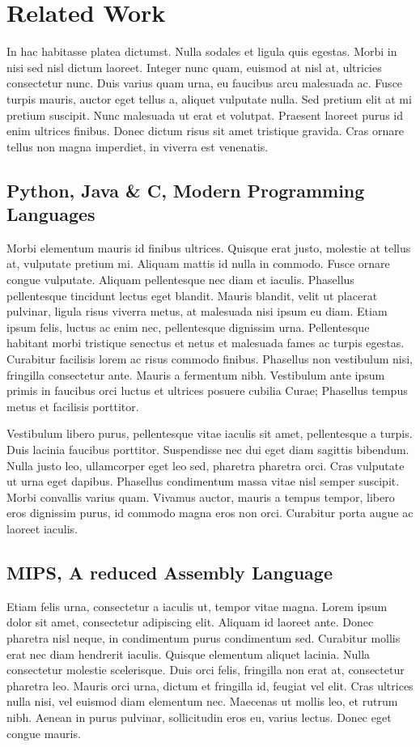 \chapter{Related Work}
In hac habitasse platea dictumst. Nulla sodales et ligula quis egestas. Morbi in nisi sed nisl dictum laoreet. Integer nunc quam, euismod at nisl at, ultricies consectetur nunc. Duis varius quam urna, eu faucibus arcu malesuada ac. Fusce turpis mauris, auctor eget tellus a, aliquet vulputate nulla. Sed pretium elit at mi pretium suscipit. Nunc malesuada ut erat et volutpat. Praesent laoreet purus id enim ultrices finibus. Donec dictum risus sit amet tristique gravida. Cras ornare tellus non magna imperdiet, in viverra est venenatis.


\section{Python, Java \& C, Modern Programming Languages}
Morbi elementum mauris id finibus ultrices. Quisque erat justo, molestie at tellus at, vulputate pretium mi. Aliquam mattis id nulla in commodo. Fusce ornare congue vulputate. Aliquam pellentesque nec diam et iaculis. Phasellus pellentesque tincidunt lectus eget blandit. Mauris blandit, velit ut placerat pulvinar, ligula risus viverra metus, at malesuada nisi ipsum eu diam. Etiam ipsum felis, luctus ac enim nec, pellentesque dignissim urna. Pellentesque habitant morbi tristique senectus et netus et malesuada fames ac turpis egestas. Curabitur facilisis lorem ac risus commodo finibus. Phasellus non vestibulum nisi, fringilla consectetur ante. Mauris a fermentum nibh. Vestibulum ante ipsum primis in faucibus orci luctus et ultrices posuere cubilia Curae; Phasellus tempus metus et facilisis porttitor.

Vestibulum libero purus, pellentesque vitae iaculis sit amet, pellentesque a turpis. Duis lacinia faucibus porttitor. Suspendisse nec dui eget diam sagittis bibendum. Nulla justo leo, ullamcorper eget leo sed, pharetra pharetra orci. Cras vulputate ut urna eget dapibus. Phasellus condimentum massa vitae nisl semper suscipit. Morbi convallis varius quam. Vivamus auctor, mauris a tempus tempor, libero eros dignissim purus, id commodo magna eros non orci. Curabitur porta augue ac laoreet iaculis.


\section{MIPS, A reduced Assembly Language}
Etiam felis urna, consectetur a iaculis ut, tempor vitae magna. Lorem ipsum dolor sit amet, consectetur adipiscing elit. Aliquam id laoreet ante. Donec pharetra nisl neque, in condimentum purus condimentum sed. Curabitur mollis erat nec diam hendrerit iaculis. Quisque elementum aliquet lacinia. Nulla consectetur molestie scelerisque. Duis orci felis, fringilla non erat at, consectetur pharetra leo. Mauris orci urna, dictum et fringilla id, feugiat vel elit. Cras ultrices nulla nisi, vel euismod diam elementum nec. Maecenas ut mollis leo, et rutrum nibh. Aenean in purus pulvinar, sollicitudin eros eu, varius lectus. Donec eget congue mauris.


